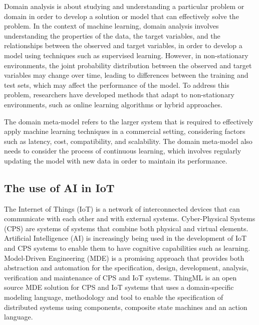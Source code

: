 Domain analysis \cite{mdApproachMonitoring}  is about studying and understanding a particular problem or domain in order to develop a solution or model that can effectively solve the problem. In the context of machine learning, domain analysis involves understanding the properties of the data, the target variables, and the relationships between the observed and target variables, in order to develop a model using techniques such as supervised learning. However, in non-stationary environments, the joint probability distribution between the observed and target variables may change over time, leading to differences between the training and test sets, which may affect the performance of the model. To address this problem, researchers have developed methods that adapt to non-stationary environments, such as online learning algorithms or hybrid approaches.

The domain meta-model refers to the larger system that is required to effectively apply machine learning techniques in a commercial setting, considering factors such as latency, cost, compatibility, and scalability. The domain meta-model also needs to consider the process of continuous learning, which involves regularly updating the model with new data in order to maintain its performance. 

\subsection{The use of AI in IoT}
The Internet of Things (IoT) is a network of interconnected devices that can communicate with each other and with external systems. Cyber-Physical Systems (CPS) are systems of systems that combine both physical and virtual elements. Artificial Intelligence (AI) is increasingly being used in the development of IoT and CPS systems to enable them to have cognitive capabilities such as learning. Model-Driven Engineering (MDE) is a promising approach that provides both abstraction and automation for the specification, design, development, analysis, verification and maintenance of CPS and IoT systems. ThingML \cite{ThingML} is an open source MDE solution for CPS and IoT systems that uses a domain-specific modeling language, methodology and tool to enable the specification of distributed systems using components, composite state machines and an action language. 

